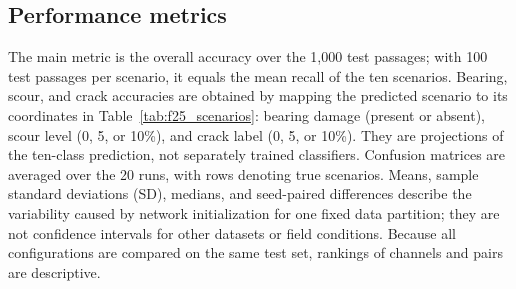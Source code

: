\subsection{Performance metrics}
\label{sec:metrics}

The main metric is the overall accuracy over the 1,000 test passages; with 100
test passages per scenario, it equals the mean recall of the ten scenarios.
Bearing, scour, and crack accuracies are obtained by mapping the predicted
scenario to its coordinates in Table~\ref{tab:f25_scenarios}: bearing damage
(present or absent), scour level (0, 5, or 10\%), and crack label (0, 5, or
10\%). They are projections of the ten-class prediction, not separately trained
classifiers. Confusion matrices are averaged over the 20 runs, with rows
denoting true scenarios. Means, sample standard deviations (SD), medians, and
seed-paired differences describe the variability caused by network
initialization for one fixed data partition; they are not confidence intervals
for other datasets or field conditions. Because all configurations are compared
on the same test set, rankings of channels and pairs are descriptive.
